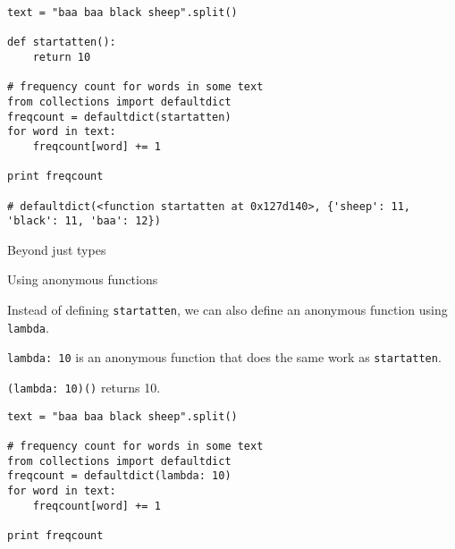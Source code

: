 \documentclass{beamer}
\begin{document}
\begin{lrbox}{\mysavebox}
\begin{lstlisting}
text = "baa baa black sheep".split()

def startatten():
    return 10

# frequency count for words in some text
from collections import defaultdict
freqcount = defaultdict(startatten)
for word in text:
    freqcount[word] += 1

print freqcount 

# defaultdict(<function startatten at 0x127d140>, {'sheep': 11, 'black': 11, 'baa': 12})

\end{lstlisting}
\end{lrbox}

\begin{frame}{Beyond just types}
 
\vspace{1.5em}
{\usebox{\mysavebox}}


\vspace{1em}
\end{frame}

\begin{frame}{Using anonymous functions}


Instead of defining \lstinline$startatten$, we can also define an anonymous function using \lstinline$lambda$.

\bigskip

\lstinline$lambda: 10$ is an anonymous function that does the same work as \lstinline$startatten$.

\bigskip

\lstinline$(lambda: 10)()$ returns 10.
\end{frame}

%
%
%
%
%
%
%
%
%


\begin{lrbox}{\mysavebox}
\begin{lstlisting}
text = "baa baa black sheep".split()

# frequency count for words in some text
from collections import defaultdict
freqcount = defaultdict(lambda: 10)
for word in text:
    freqcount[word] += 1

print freqcount 
\end{lstlisting}
\end{lrbox}
\end{document}
